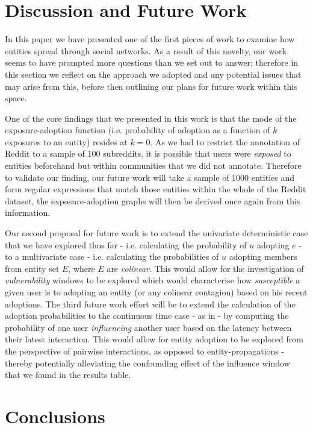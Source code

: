 \documentclass[journal,10pt,draftclsnofoot,onecolumn]{IEEEtran}
\begin{document}
\section{Discussion and Future Work}
In this paper we have presented one of the first pieces of work to examine how entities spread through social networks.
As a result of this novelty, our work seems to have prompted more questions than we set out to answer; therefore in this section we reflect on the approach we adopted and any potential issues that may arise from this, before then outlining our plans for future work within this space.

One of the core findings that we presented in this work is that the mode of the exposure-adoption function (i.e. probability of adoption as a function of $k$ exposures to an entity) resides at $k=0$.
As we had to restrict the annotation of Reddit to a sample of 100 subreddits, it is possible that users were \emph{exposed} to entities beforehand but within communities that we did not annotate.
Therefore to validate our finding, our future work will take a sample of 1000 entities and form regular expressions that match those entities within the whole of the Reddit dataset, the exposure-adoption graphs will then be derived once again from this information.

Our second proposal for future work is to extend the univariate deterministic case that we have explored thus far - i.e. calculating the probability of $u$ adopting $e$ - to a multivariate case - i.e. calculating the probabilities of $u$ adopting members from entity set $E$, where $E$ are \emph{colinear}.
This would allow for the investigation of \emph{vulnerability} windows to be explored which would characterise how \emph{susceptible} a given user is to adopting an entity (or any colinear contagion) based on his recent adoptions.
The third future work effort will be to extend the calculation of the adoption probabilities to the continuous time case - as in \cite{huang2014temporal} - by computing the probability of one user \emph{influencing} another user based on the latency between their latest interaction.
This would allow for entity adoption to be explored from the perspective of pairwise interactions, as opposed to entity-propagations - thereby potentially alleviating the confounding effect of the influence window that we found in the results table.




\section{Conclusions}
\end{document}
